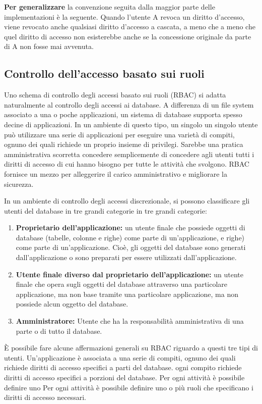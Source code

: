 \begin{center}
    \textbf{Per generalizzare} la convenzione seguita dalla maggior parte delle implementazioni è la seguente. Quando l'utente A revoca un diritto d'accesso, viene revocato anche qualsiasi diritto d'accesso a cascata, a meno che a meno che quel diritto di accesso non esisterebbe anche se la concessione originale da parte di A non fosse mai avvenuta.
\end{center}

\subsection{Controllo dell'accesso basato sui ruoli}
Uno schema di controllo degli accessi basato sui ruoli (RBAC) si adatta naturalmente al controllo degli accessi ai database. A differenza di un file system associato a una o poche applicazioni, un sistema di database supporta spesso decine di applicazioni. In un ambiente di questo tipo, un singolo un singolo utente può utilizzare una serie di applicazioni per eseguire una varietà di compiti, ognuno dei quali richiede un proprio insieme di privilegi. Sarebbe una pratica amministrativa scorretta concedere semplicemente di concedere agli utenti tutti i diritti di accesso di cui hanno bisogno per tutte le attività che svolgono. RBAC fornisce un mezzo per alleggerire il carico amministrativo e migliorare la sicurezza.

\singlespacing

In un ambiente di controllo degli accessi discrezionale, si possono classificare gli utenti del database in tre grandi categorie in tre grandi categorie:

\begin{enumerate}
    \item \textbf{Proprietario dell'applicazione:} un utente finale che possiede oggetti di database (tabelle, colonne e righe) come parte di un'applicazione, e righe) come parte di un'applicazione. Cioè, gli oggetti del database sono generati dall'applicazione o sono preparati per essere utilizzati dall'applicazione.
    
    \item \textbf{Utente finale diverso dal proprietario dell'applicazione:} un utente finale che opera sugli oggetti del database attraverso una particolare applicazione, ma non base tramite una particolare applicazione, ma non possiede alcun oggetto del database.
    
    \item \textbf{Amministratore:} Utente che ha la responsabilità amministrativa di una parte o di tutto il database.
\end{enumerate}
È possibile fare alcune affermazioni generali su RBAC riguardo a questi tre tipi di utenti. Un'applicazione è associata a una serie di compiti, ognuno dei quali richiede diritti di accesso specifici a parti del database. ogni compito richiede diritti di accesso specifici a porzioni del database. Per ogni attività è possibile definire uno Per ogni attività è possibile definire uno o più ruoli che specificano i diritti di accesso necessari. 

